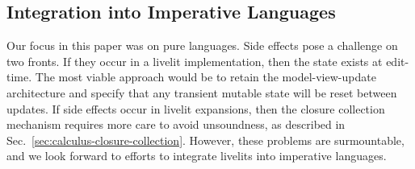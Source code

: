 
\subsection{Integration into Imperative Languages}
\label{sec:imperative-langs}
Our focus in this paper was on pure languages.
Side effects pose a challenge on two fronts.
If they occur in a livelit implementation,
then the state exists at edit-time. 
The most viable approach would be to retain the model-view-update
architecture and specify that any transient mutable state will be reset between updates.
If side effects occur in livelit expansions, 
then the closure collection mechanism requires more 
care to avoid unsoundness, as described in Sec.~\ref{sec:calculus-closure-collection}.
However, these problems are surmountable, and we look forward to 
efforts to integrate livelits into imperative languages. 

